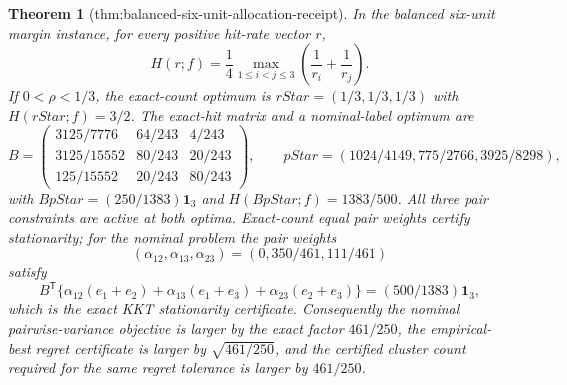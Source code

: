 \documentclass{article}
\newtheorem{theorem}{Theorem}
\begin{document}
\begin{theorem}[thm:balanced-six-unit-allocation-receipt]\label{thm:balanced-six-unit-allocation-receipt}
In the balanced six-unit margin instance, for every positive hit-rate vector \(r\),
\[
H(r;f)=\frac14\max_{1\le i<j\le3}\left(\frac1{r_i}+\frac1{r_j}\right).
\]
If \(0<\rho<1/3\), the exact-count optimum is \(rStar=(1/3,1/3,1/3)\) with \(H(rStar;f)=3/2\). The exact-hit matrix and a nominal-label optimum are
\[
B=\begin{pmatrix}
3125/7776&64/243&4/243\\
3125/15552&80/243&20/243\\
125/15552&20/243&80/243
\end{pmatrix},\qquad
pStar=\left(1024/4149,775/2766,3925/8298\right),
\]
with \(BpStar=(250/1383)\mathbf1_3\) and \(H(BpStar;f)=1383/500\). All three pair constraints are active at both optima. Exact-count equal pair weights certify stationarity; for the nominal problem the pair weights
\[
(\alpha_{12},\alpha_{13},\alpha_{23})=(0,350/461,111/461)
\]
satisfy
\[
B^{\mathsf T}\{\alpha_{12}(e_1+e_2)+\alpha_{13}(e_1+e_3)+\alpha_{23}(e_2+e_3)\}=(500/1383)\mathbf1_3,
\]
which is the exact KKT stationarity certificate. Consequently the nominal pairwise-variance objective is larger by the exact factor \(461/250\), the empirical-best regret certificate is larger by \(\sqrt{461/250}\), and the certified cluster count required for the same regret tolerance is larger by \(461/250\).
\end{theorem}
\end{document}
